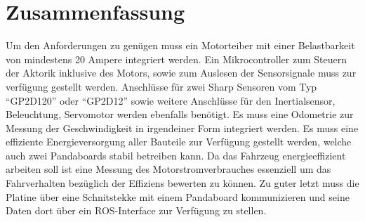 \section{Zusammenfassung}
Um den Anforderungen zu genügen muss ein Motorteiber mit einer Belastbarkeit von mindestens 20 Ampere integriert werden. 
Ein Mikrocontroller zum Steuern der Aktorik inklusive des Motors, sowie zum Auslesen der Sensorsignale muss zur verfügung gestellt werden. 
Anschlüsse für zwei Sharp Sensoren vom Typ ``GP2D120'' oder ``GP2D12'' sowie weitere Anschlüsse für den Inertialsensor, Beleuchtung, Servomotor werden ebenfalls benötigt. 
Es muss eine Odometrie zur Messung der Geschwindigkeit in irgendeiner Form integriert werden.
Es muss eine effiziente Energieversorgung aller Bauteile zur Verfügung gestellt werden, welche auch zwei Pandaboards stabil betreiben kann. 
Da das Fahrzeug energieeffizient arbeiten soll ist eine Messung des Motorstromverbrauches essenziell um das Fahrverhalten bezüglich der Effiziens bewerten zu können.
Zu guter letzt muss die Platine über eine Schnitstekke mit einem Pandaboard kommunizieren und seine Daten dort über ein ROS-Interface zur Verfügung zu stellen.

